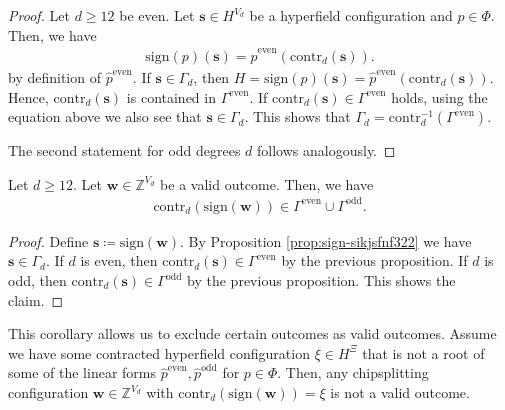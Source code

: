 \begin{proof}
    Let \( d \geq 12 \) be even. Let \( \mathbf{s} \in {H}^{V_d} \) be a hyperfield configuration and \( p \in \Phi \). Then, we have 
    \begin{align*}
        \mathrm{sign}(p)(\mathbf{s}) = \hat p^{\mathrm{even}}(\mathrm{contr}_d(\mathbf{s})).
    \end{align*}
    by definition of \( \hat p^{\mathrm{even}} \). If \( \mathbf{s} \in \Gamma_d \), then \( H = \mathrm{sign}(p)(\mathbf{s}) = \hat p^{\mathrm{even}}(\mathrm{contr}_d(\mathbf{s})) \). Hence, \( \mathrm{contr}_d(\mathbf{s}) \) is contained in \( \Gamma^{\mathrm{even}} \). If \( \mathrm{contr}_d(\mathbf{s}) \in \Gamma^{\mathrm{even}} \) holds, using the equation above we also see that \( \mathbf{s} \in \Gamma_d \). This shows that \( \Gamma_d = \mathrm{contr}_d^{-1}(\Gamma^{\mathrm{even}}) \).

    The second statement for odd degrees \( d \) follows analogously.
\end{proof}

\begin{corollary}
    Let \( d \geq 12 \). Let \( \mathbf{w} \in \mathbb{Z}^{V_d} \) be a valid outcome. Then, we have 
    \begin{align*}
        \mathrm{contr}_d(\mathrm{sign}(\mathbf{w})) \in \Gamma^{\mathrm{even}} \cup \Gamma^{\mathrm{odd}}.
    \end{align*}
\end{corollary}

\begin{proof}
    Define \( \mathbf{s} \coloneqq \mathrm{sign}(\mathbf{w}) \). By Proposition \ref{prop:sign-sikjsfnf322} we have \( \mathbf{s} \in \Gamma_d \). If \( d \) is even, then \( \mathrm{contr}_d(\mathbf{s}) \in \Gamma^{\mathrm{even}} \) by the previous proposition. If \( d \) is odd, then \( \mathrm{contr}_d(\mathbf{s}) \in \Gamma^{\mathrm{odd}} \) by the previous proposition. This shows the claim.
\end{proof}

This corollary allows us to exclude certain outcomes as valid outcomes. Assume we have some contracted hyperfield configuration \( \xi \in H^{\Xi} \) that is not a root of some of the linear forms \( \hat p^{\mathrm{even}}, \hat p^{\mathrm{odd}} \) for \( p \in \Phi \). Then, any chipsplitting configuration \( \mathbf{w} \in \mathbb{Z}^{V_d} \) with \( \mathrm{contr}_d( \mathrm{sign}(\mathbf{w})) = \xi \) is not a valid outcome.


